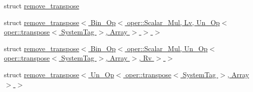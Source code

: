 \begin{DoxyCompactItemize}
\item 
struct \hyperlink{structbc_1_1tensors_1_1exprs_1_1detail_1_1remove__transpose}{remove\+\_\+transpose}
\item 
struct \hyperlink{structbc_1_1tensors_1_1exprs_1_1detail_1_1remove__transpose_3_01Bin__Op_3_01oper_1_1Scalar__Mul_66d4ba5d587ca66fdce7c61c9a3f28e3}{remove\+\_\+transpose$<$ Bin\+\_\+\+Op$<$ oper\+::\+Scalar\+\_\+\+Mul, Lv, Un\+\_\+\+Op$<$ oper\+::transpose$<$ System\+Tag $>$, Array $>$ $>$ $>$}
\item 
struct \hyperlink{structbc_1_1tensors_1_1exprs_1_1detail_1_1remove__transpose_3_01Bin__Op_3_01oper_1_1Scalar__Mul_6b5c3eb4d56201d2dc306da5aaee0671}{remove\+\_\+transpose$<$ Bin\+\_\+\+Op$<$ oper\+::\+Scalar\+\_\+\+Mul, Un\+\_\+\+Op$<$ oper\+::transpose$<$ System\+Tag $>$, Array $>$, Rv $>$ $>$}
\item 
struct \hyperlink{structbc_1_1tensors_1_1exprs_1_1detail_1_1remove__transpose_3_01Un__Op_3_01oper_1_1transpose_3_0108540817e9a89440300c45967e20325}{remove\+\_\+transpose$<$ Un\+\_\+\+Op$<$ oper\+::transpose$<$ System\+Tag $>$, Array $>$ $>$}
\end{DoxyCompactItemize}
